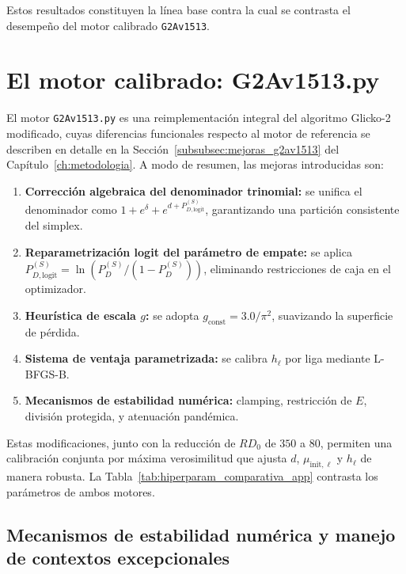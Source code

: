 Estos resultados constituyen la l\'inea base contra la cual se contrasta el desempe\~no del motor calibrado \texttt{G2Av1513}.


\section{El motor calibrado: G2Av1513.py}

El motor \texttt{G2Av1513.py} es una reimplementaci\'on integral del algoritmo Glicko-2 modificado, cuyas diferencias funcionales respecto al motor de referencia se describen en detalle en la Secci\'on~\ref{subsubsec:mejoras_g2av1513} del Cap\'itulo~\ref{ch:metodologia}. A modo de resumen, las mejoras introducidas son:

\begin{enumerate}
	\item \textbf{Correcci\'on algebraica del denominador trinomial:} se unifica el denominador como $1+e^\delta+e^{d+P_{D,\text{logit}}^{(S)}}$, garantizando una partici\'on consistente del simplex.
	\item \textbf{Reparametrizaci\'on logit del par\'ametro de empate:} se aplica $P_{D,\text{logit}}^{(S)} = \ln(P_D^{(S)}/(1-P_D^{(S)}))$, eliminando restricciones de caja en el optimizador.
	\item \textbf{Heur\'istica de escala $g$:} se adopta $g_{\text{const}} = 3.0/\pi^2$, suavizando la superficie de p\'erdida.
	\item \textbf{Sistema de ventaja parametrizada:} se calibra $h_\ell$ por liga mediante L-BFGS-B.
	\item \textbf{Mecanismos de estabilidad num\'erica:} clamping, restricci\'on de $E$, divisi\'on protegida, y atenuaci\'on pand\'emica.
\end{enumerate}

Estas modificaciones, junto con la reducci\'on de $RD_0$ de $350$ a $80$, permiten una calibraci\'on conjunta por m\'axima verosimilitud que ajusta $d$, $\mu_{\text{init},\ell}$ y $h_\ell$ de manera robusta. La Tabla~\ref{tab:hiperparam_comparativa_app} contrasta los par\'ametros de ambos motores.

\subsection{Mecanismos de estabilidad num\'erica y manejo de contextos excepcionales}
\label{subsec:naive_vs_g2a_estabilidad_numerica}

